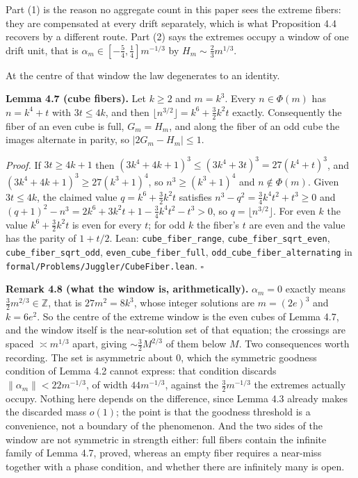 \documentclass[11pt,a4paper]{article}
\begin{document}
Part (1) is the reason no aggregate count in this paper sees the extreme
fibers: they are compensated at every drift separately, which is what
Proposition 4.4 recovers by a different route. Part (2) says the
extremes occupy a window of one drift unit, that is
\(\alpha_m\in[-\tfrac54,\tfrac14]m^{-1/3}\) by
\(H_m\sim\tfrac23m^{1/3}\).

At the centre of that window the law degenerates to an identity.

\textbf{Lemma 4.7 (cube fibers).} Let \(k\ge2\) and \(m=k^3\). Every
\(n\in\Phi(m)\) has \(n=k^4+t\) with \(3t\le4k\), and then
\(\lfloor n^{3/2}\rfloor=k^6+\tfrac32k^2t\) exactly. Consequently the
fiber of an even cube is full, \(G_m=H_m\), and along the fiber of an
odd cube the images alternate in parity, so \(|2G_m-H_m|\le1\).

\emph{Proof.} If \(3t\ge4k+1\) then
\((3k^4+4k+1)^3\le(3k^4+3t)^3=27(k^4+t)^3\), and
\((3k^4+4k+1)^3\ge27(k^3+1)^4\), so \(n^3\ge(k^3+1)^4\) and
\(n\notin\Phi(m)\). Given \(3t\le4k\), the claimed value
\(q=k^6+\tfrac32k^2t\) satisfies \(n^3-q^2=\tfrac34k^4t^2+t^3\ge0\) and
\((q+1)^2-n^3=2k^6+3k^2t+1-\tfrac34k^4t^2-t^3>0\), so
\(q=\lfloor n^{3/2}\rfloor\). For even \(k\) the value
\(k^6+\tfrac32k^2t\) is even for every \(t\); for odd \(k\) the fiber's
\(t\) are even and the value has the parity of \(1+t/2\). Lean:
\texttt{\nolinkurl{cube_fiber_range}},
\texttt{\nolinkurl{cube_fiber_sqrt_even}},
\texttt{\nolinkurl{cube_fiber_sqrt_odd}},
\texttt{\nolinkurl{even_cube_fiber_full}},
\texttt{\nolinkurl{odd_cube_fiber_alternating}} in
\texttt{\nolinkurl{formal/Problems/Juggler/CubeFiber.lean}}. \(\square\)

\textbf{Remark 4.8 (what the window is, arithmetically).} \(\alpha_m=0\)
exactly means \(\tfrac32m^{2/3}\in\mathbb Z\), that is \(27m^2=8k^3\),
whose integer solutions are \(m=(2e)^3\) and \(k=6e^2\). So the centre
of the extreme window is the even cubes of Lemma 4.7, and the window
itself is the near-solution set of that equation; the crossings are
spaced \(\asymp m^{1/3}\) apart, giving \(\sim\tfrac32M^{2/3}\) of them
below \(M\). Two consequences worth recording. The set is asymmetric
about \(0\), which the symmetric goodness condition of Lemma 4.2 cannot
express: that condition discards \(\|\alpha_m\|<22m^{-1/3}\), of width
\(44m^{-1/3}\), against the \(\tfrac32m^{-1/3}\) the extremes actually
occupy. Nothing here depends on the difference, since Lemma 4.3 already
makes the discarded mass \(o(1)\); the point is that the goodness
threshold is a convenience, not a boundary of the phenomenon. And the
two sides of the window are not symmetric in strength either: full
fibers contain the infinite family of Lemma 4.7, proved, whereas an
empty fiber requires a near-miss together with a phase condition, and
whether there are infinitely many is open.
\end{document}
